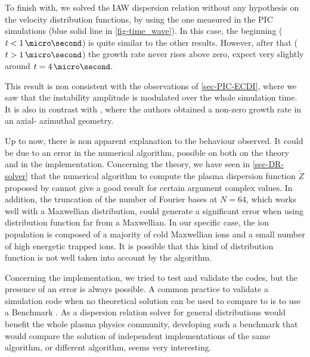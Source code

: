   \vspace{1em}
  To finish with, we solved the \ac{IAW} dispersion relation without any hypothesis on the velocity distribution functions, by using the one measured in the PIC simulations (blue solid line in  \cref{fig-time_wave}).
  In this case, the beginning ($t < 1 \,\micro\second$) is quite similar to the other results.
  However, after that ($t > 1 \,\micro\second$) the growth rate never rises above zero, expect very slightly around $t=4\,\micro\second$.
  
  This result is non consistent with the observations of \cref{sec-PIC-ECDI}, where we saw that the instability amplitude is modulated over the whole simulation time.
  It is also in contrast with \citet{lafleur2018}, where the authors obtained a non-zero growth rate in an axial- azimuthal geometry.
  
  Up to now, there is non apparent explanation to the behaviour observed.
  It could be due to an error in the numerical algorithm, possible on both on the theory and in the implementation.
  Concerning the theory, we have seen in \cref{sec-DR-solver} that the numerical algorithm to compute the plasma dispersion function $\tilde{Z}$ proposed by \citet{xiehua-sheng2013} cannot give a good result for certain argument complex values.
  In addition, the truncation of the number of Fourier bases at $N=64$, which works well with a Maxwellian distribution, could generate a significant error when using distribution function far from a Maxwellian.
  In our specific case, the ion population is composed of a majority of cold Maxwellian ions and a small number of high energetic trapped ions.
  It is possible that this kind of distribution function is not well taken into account by the algorithm.
  
  Concerning the implementation, we tried to test and validate the codes, but the presence of an error is always possible.
  A common practice to validate a simulation code when no theoretical solution can be used to compare to is to use a Benchmark \citep{turner2013}.
  As a dispersion relation solver for general distributions would benefit the whole plasma physics community, developing such a benchmark that would compare the solution of independent implementations of the same algorithm, or different algorithm, seems very interesting.
  
